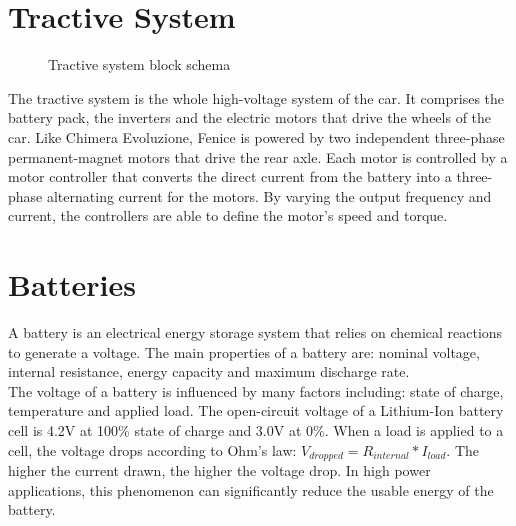 \section{Tractive System}
\begin{figure}[h]
    \centering
    
    \caption{Tractive system block schema}
    \label{fig:tractive_system}
\end{figure}
The tractive system is the whole high-voltage system of the car. It comprises the battery pack, the inverters and the electric motors that drive the wheels of the car.
Like Chimera Evoluzione, Fenice is powered by two independent three-phase permanent-magnet motors that drive the rear axle. Each motor is controlled by a motor controller that converts the direct current from the battery into a three-phase alternating current for the motors. By varying the output frequency and current, the controllers are able to define the motor's speed and torque.

\section{Batteries}
A battery is an electrical energy storage system that relies on chemical reactions to generate a voltage. The main properties of a battery are: nominal voltage, internal resistance, energy capacity and maximum discharge rate.\\
The voltage of a battery is influenced by many factors including: state of charge, temperature and applied load. The open-circuit voltage of a Lithium-Ion battery cell is 4.2V at 100\% state of charge and 3.0V at 0\%.
When a load is applied to a cell, the voltage drops according to Ohm's law: $V_{dropped} = R_{internal}*I_{load}$. The higher the current drawn, the higher the voltage drop. In high power applications, this phenomenon can significantly reduce the usable energy of the battery.

